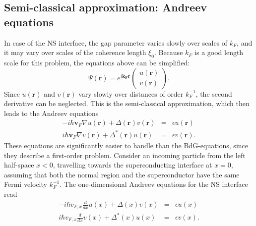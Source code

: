 \subsection*{Semi-classical approximation: Andreev equations}

In case of the NS interface, the gap parameter varies slowly over scales of $k_F$, and it may vary over scales of the coherence length $\xi_0$. Because $k_F$ is a good length scale for this problem, the equations above can be simplified:
\begin{equation}
\Psi \left( \mathbf{r} \right) = e^{i \mathbf{k_F} \mathbf{r} } \begin{pmatrix} u \left( \mathbf{r} \right) \\ v \left( \mathbf{r} \right)\end{pmatrix}.
\end{equation}
Since $u  \left( \mathbf{r} \right) $ and $v  \left( \mathbf{r} \right) $ vary slowly over distances of order $k_F^{-1}$, the second derivative can be neglected. This is the semi-classical approximation, which then leads to the Andreev equations
\begin{eqnarray}
- i \hbar \mathbf{v}_F \nabla u \left( \mathbf{r} \right)  + \Delta \left( \mathbf{r} \right)  v  \left( \mathbf{r} \right)  &=& \epsilon u  \left( \mathbf{r} \right)  \\
 i \hbar \mathbf{v}_F \nabla v  \left( \mathbf{r} \right)  + \Delta^* \left( \mathbf{r} \right)  u  \left( \mathbf{r} \right)  &=& \epsilon v  \left( \mathbf{r} \right) .
\end{eqnarray}
These equations are significantly easier to handle than the BdG-equations, since they describe a first-order problem.
\newline
\newline
Consider an incoming particle from the left half-space $x < 0 $, travelling towards the superconducting interface at $x=0$, assuming that both the normal region and the superconductor have the same Fermi velocity $k_F^{-1}$. The one-dimensional Andreev equations for the NS interface read
\begin{eqnarray}
- i \hbar v_{F, x} \frac{d}{d x} u \left( x \right)  + \Delta(x) v \left( x \right) &=& \epsilon u \left( x \right)\\
 i \hbar v_{F, x} \frac{d}{d x} v \left( x \right) + \Delta^*(x) u \left( x \right) &=& \epsilon v \left( x \right).
\end{eqnarray}
